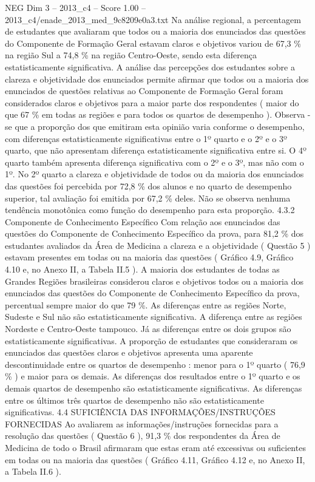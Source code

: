 \begin{textsample}{NEG Dim 3 – 2013\_c4 – Score 1.00 – 2013\_c4/enade\_2013\_med\_9c8209e0a3.txt}
Na análise regional, a percentagem de estudantes que avaliaram que todos ou a maioria dos enunciados das questões do Componente de Formação Geral estavam claros e objetivos variou de 67,3 \% na região Sul a 74,8 \% na região Centro-Oeste, sendo esta diferença estatisticamente significativa.
A análise das percepções dos estudantes sobre a clareza e objetividade dos enunciados permite afirmar que todos ou a maioria dos enunciados de questões relativas ao Componente de Formação Geral foram considerados claros e objetivos para a maior parte dos respondentes ( maior do que 67 \% em todas as regiões e para todos os quartos de desempenho ).
Observa -se que a proporção dos que emitiram esta opinião varia conforme o desempenho, com diferenças estatisticamente significativas entre o 1º quarto e o 2º e o 3º quarto, que não apresentam diferença estatisticamente significativa entre si.
O 4º quarto também apresenta diferença significativa com o 2º e o 3º, mas não com o 1º.
No 2º quarto a clareza e objetividade de todos ou da maioria dos enunciados das questões foi percebida por 72,8 \% dos alunos e no quarto de desempenho superior, tal avaliação foi emitida por 67,2 \% deles.
Não se observa nenhuma tendência monotônica como função do desempenho para esta proporção. 4.3.2 Componente de Conhecimento Específico Com relação aos enunciados das questões do Componente de Conhecimento Específico da prova, para 81,2 \% dos estudantes avaliados da Área de Medicina a clareza e a objetividade ( Questão 5 ) estavam presentes em todas ou na maioria das questões ( Gráfico 4.9, Gráfico 4.10 e, no Anexo II, a Tabela II.5 ).
A maioria dos estudantes de todas as Grandes Regiões brasileiras considerou claros e objetivos todos ou a maioria dos enunciados das questões do Componente de Conhecimento Específico da prova, percentual sempre maior do que 79 \%.
As diferenças entre as regiões Norte, Sudeste e Sul não são estatisticamente significativa.
A diferença entre as regiões Nordeste e Centro-Oeste tampouco.
Já as diferenças entre os dois grupos são estatisticamente significativas.
A proporção de estudantes que consideraram os enunciados das questões claros e objetivos apresenta uma aparente descontinuidade entre os quartos de desempenho : menor para o 1º quarto ( 76,9 \% ) e maior para os demais.
As diferenças dos resultados entre o 1º quarto e os demais quartos de desempenho são estatisticamente significativas.
As diferenças entre os últimos três quartos de desempenho não são estatisticamente significativas. 4.4 SUFICIÊNCIA DAS INFORMAÇÕES/INSTRUÇÕES FORNECIDAS Ao avaliarem as informações/instruções fornecidas para a resolução das questões ( Questão 6 ), 91,3 \% dos respondentes da Área de Medicina de todo o Brasil afirmaram que estas eram até excessivas ou suficientes em todas ou na maioria das questões ( Gráfico 4.11, Gráfico 4.12 e, no Anexo II, a Tabela II.6 ).

\end{textsample}
